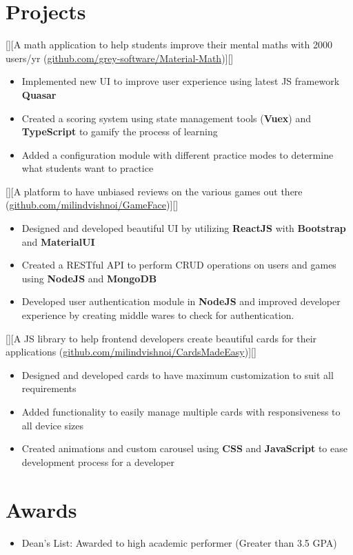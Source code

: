 \documentclass{article}
\begin{document}
 
 
\section{Projects}
[][A math application to help students improve their mental maths with 2000 users/yr (\href{https://github.com/grey-software/Material-Math}{github.com/grey-software/Material-Math})][]

 \begin{itemize}
    \item Implemented new UI to improve user experience using latest JS framework \textbf{Quasar}
    \item Created a scoring system using state management tools (\textbf{Vuex}) and \textbf{TypeScript} to gamify the process of learning
    \item Added a configuration module with different practice modes to determine what students want to practice
 \end{itemize}
 
 [][A platform to have unbiased reviews on the various games out there (\href{https://github.com/milindvishnoi/GameFace}{github.com/milindvishnoi/GameFace})][]

 \begin{itemize}
    \item Designed and developed beautiful UI by utilizing \textbf{ReactJS} with \textbf{Bootstrap} and \textbf{MaterialUI}
    \item Created a RESTful API to perform CRUD operations on users and games using \textbf{NodeJS} and \textbf{MongoDB}
    \item Developed user authentication module in \textbf{NodeJS} and improved developer experience by creating middle wares to check for authentication.
 \end{itemize}
 
 [][A JS library to help frontend developers create beautiful cards for their applications (\href{https://github.com/milindvishnoi/CardsMadeEasy}{github.com/milindvishnoi/CardsMadeEasy})][]

 \begin{itemize}
    \item Designed and developed cards to have maximum customization to suit all requirements
    \item Added functionality to easily manage multiple cards with responsiveness to all device sizes
    \item Created animations and custom carousel using \textbf{CSS} and \textbf{JavaScript} to ease development process for a developer
 \end{itemize}



\section{Awards}
\begin{itemize}
\item Dean's List: Awarded to high academic performer (Greater than 3.5 GPA)
\end{itemize}
\end{document}
